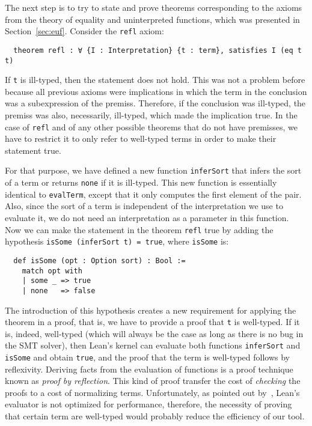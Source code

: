 The next step is to try to state and prove theorems corresponding to the
axioms from the theory of equality and uninterpreted functions, which
was presented in Section~\ref{sec:euf}. Consider the \texttt{refl} axiom:

\begin{verbatim}
  theorem refl : ∀ {I : Interpretation} {t : term}, satisfies I (eq t t)
\end{verbatim}

If \texttt{t} is ill-typed, then the statement does not hold. This was not
a problem before because all previous axioms were implications in which
the term in the conclusion was a subexpression of the premiss. Therefore,
if the conclusion was ill-typed, the premiss was also, necessarily, ill-typed,
which made the implication true. In the case of \texttt{refl} and of
any other possible theorems that do not have premisses, we have to restrict it
to only refer to well-typed terms in order to make their statement true.

For that purpose, we have defined a new function \texttt{inferSort} that infers the sort of a term
or returns \texttt{none} if it is ill-typed.
This new function is essentially identical to
\texttt{evalTerm}, except that it only computes the first element of the pair.
Also, since the sort of a term is independent of the interpretation we use
to evaluate it, we do not need an interpretation as a parameter in this function.
Now we can make the statement in the theorem \texttt{refl} true by adding the hypothesis
\texttt{isSome (inferSort t) = true}, where \texttt{isSome} is:

\begin{verbatim}
  def isSome (opt : Option sort) : Bool :=
    match opt with
    | some _ => true
    | none   => false
\end{verbatim}

The introduction of this hypothesis creates a new requirement for applying
the theorem in a proof, that is, we have to provide a proof that \texttt{t} is well-typed.
If it is, indeed, well-typed (which will always be the case as long
as there is no bug in the SMT solver), then Lean's kernel can evaluate
both functions \texttt{inferSort} and \texttt{isSome} and obtain \texttt{true},
and the proof that the term is well-typed follows by reflexivity. Deriving facts
from the evaluation of functions is a proof technique known as \textit{proof by reflection}.
This kind of proof transfer the cost of \textit{checking} the proofs to a cost of
normalizing terms. Unfortunately, as pointed out by~\cite{ringLean}, Lean's evaluator
is not optimized for performance, therefore, the necessity of proving that certain term are
well-typed would probably reduce the efficiency of our tool.

